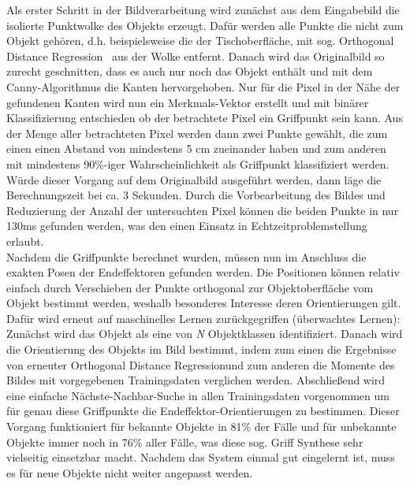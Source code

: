 Als erster Schritt in der Bildverarbeitung wird zunächst aus dem Eingabebild die isolierte Punktwolke des Objekts erzeugt. Dafür werden alle Punkte die nicht zum Objekt gehören, d.h. beispielsweise die der Tischoberfläche, mit sog. \glqq Orthogonal Distance Regression\grqq~\citep{shakarji1998least} aus der Wolke entfernt. Danach wird das Originalbild so zurecht geschnitten, dass es auch nur noch das Objekt enthält und mit dem \glqq Canny\grqq -Algorithmus die Kanten hervorgehoben. Nur für die Pixel in der Nähe der gefundenen Kanten wird nun ein Merkmals-Vektor erstellt und mit binärer Klassifizierung entschieden ob der betrachtete Pixel ein Griffpunkt sein kann. Aus der Menge aller betrachteten Pixel werden dann zwei Punkte gewählt, die zum einen einen Abstand von mindestens 5 cm zueinander haben und zum anderen mit mindestens 90\%-iger Wahrscheinlichkeit als Griffpunkt klassifiziert werden.\\ Würde dieser Vorgang auf dem Originalbild ausgeführt werden, dann läge die Berechnungszeit bei ca. 3 Sekunden. Durch die Vorbearbeitung des Bildes und Reduzierung der Anzahl der untersuchten Pixel können die beiden Punkte in nur 130ms \citep[Abschnitt IV-A]{balaguer2012bimanual} gefunden werden, was den einen Einsatz in Echtzeitproblemstellung erlaubt.
\\

Nachdem die Griffpunkte berechnet wurden, müssen nun im Anschluss die exakten Posen der Endeffektoren gefunden werden. Die Positionen können relativ einfach durch Verschieben der Punkte orthogonal zur Objektoberfläche vom Objekt bestimmt werden, weshalb besonderes Interesse deren Orientierungen gilt. Dafür wird erneut auf maschinelles Lernen zurückgegriffen (überwachtes Lernen): Zunächst wird das Objekt als eine von \textit{N} Objektklassen identifiziert. Danach wird die Orientierung des Objekts im Bild bestimmt, indem zum einen die Ergebnisse von erneuter \glqq Orthogonal Distance Regression\grqq und zum anderen die Momente des Bildes mit vorgegebenen Trainingsdaten verglichen werden. Abschließend wird eine einfache Nächste-Nachbar-Suche in allen Trainingsdaten vorgenommen um für genau diese Griffpunkte die Endeffektor-Orientierungen zu bestimmen. Dieser Vorgang funktioniert für bekannte Objekte in 81\% der Fälle und für unbekannte Objekte immer noch in 76\% aller Fälle, was diese sog. \glqq Griff Synthese\grqq{} sehr vielseitig einsetzbar macht. Nachdem das System einmal gut eingelernt ist, muss es für neue Objekte nicht weiter angepasst werden.
\\

